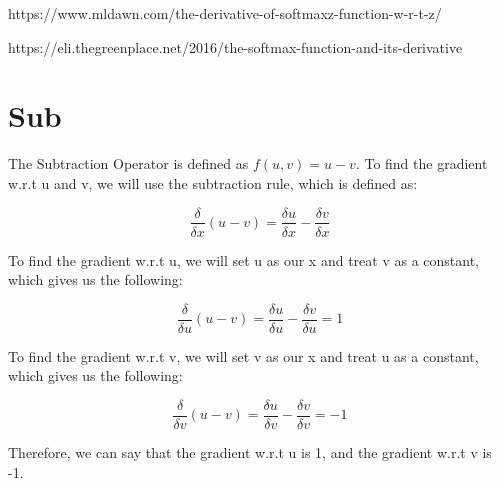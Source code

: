 \documentclass{article}
\begin{document}
        https://www.mldawn.com/the-derivative-of-softmaxz-function-w-r-t-z/
        
        https://eli.thegreenplace.net/2016/the-softmax-function-and-its-derivative

\noindent\makebox[\linewidth]{\rule{\paperwidth}{0.4pt}}  
    \section{Sub}
        The Subtraction Operator is defined as $f(u,v) = u - v$. To find the gradient w.r.t u and v, 
        we will use the subtraction rule, which is defined as: 
    
        $$\frac{\delta}{\delta{x}}(u - v) = \frac{\delta{u}}{\delta{x}} - \frac{\delta{v}}{\delta{x}}$$
    
        To find the gradient w.r.t u, we will set u as our x and treat v as a constant, 
        which gives us the following:
    
        $$\frac{\delta}{\delta{u}}(u - v) = \frac{\delta{u}}{\delta{u}} - \frac{\delta{v}}{\delta{u}} = 1$$
    
        To find the gradient w.r.t v, we will set v as our x and treat u as a constant, 
        which gives us the following:
    
        $$\frac{\delta}{\delta{v}}(u - v) = \frac{\delta{u}}{\delta{v}} - \frac{\delta{v}}{\delta{v}} = -1$$
    
        Therefore, we can say that the gradient w.r.t u is 1, and the gradient w.r.t v is -1. 
\end{document}

